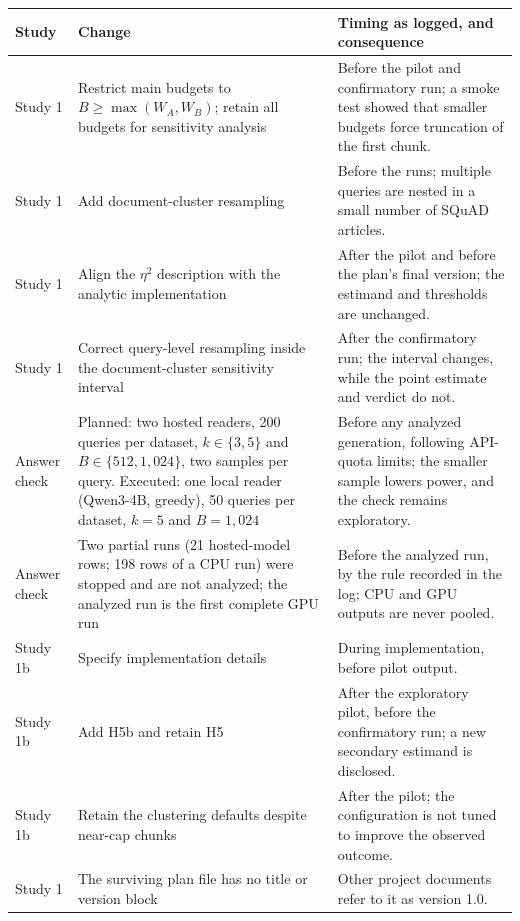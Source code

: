 \documentclass[11pt]{article}
\let\RepoTable\table
\let\EndRepoTable\endtable
\renewenvironment{table}[1][htbp]{\RepoTable[htbp]}{\EndRepoTable}
\begin{document}
\begin{table}[htbp]\centering\footnotesize
\caption{Study-plan deviations (as logged) and differences between the plans' text and the implementation.}\label{tab:deviations}
\begin{tabular}{@{}>{\raggedright\arraybackslash}p{1.55cm}>{\raggedright\arraybackslash}p{5.5cm}>{\raggedright\arraybackslash}p{7.4cm}@{}}\toprule
Study & Change & Timing as logged, and consequence\\\midrule
Study 1 & Restrict main budgets to $B\geq\max(W_A,W_B)$; retain all budgets for sensitivity analysis & Before the pilot and confirmatory run; a smoke test showed that smaller budgets force truncation of the first chunk.\\
Study 1 & Add document-cluster resampling & Before the runs; multiple queries are nested in a small number of SQuAD articles.\\
Study 1 & Align the $\eta^2$ description with the analytic implementation & After the pilot and before the plan's final version; the estimand and thresholds are unchanged.\\
Study 1 & Correct query-level resampling inside the document-cluster sensitivity interval & After the confirmatory run; the interval changes, while the point estimate and verdict do not.\\
Answer check & Planned: two hosted readers, 200 queries per dataset, $k\in\{3,5\}$ and $B\in\{512,1{,}024\}$, two samples per query. Executed: one local reader (Qwen3-4B, greedy), 50 queries per dataset, $k=5$ and $B=1{,}024$ & Before any analyzed generation, following API-quota limits; the smaller sample lowers power, and the check remains exploratory.\\
Answer check & Two partial runs (21 hosted-model rows; 198 rows of a CPU run) were stopped and are not analyzed; the analyzed run is the first complete GPU run & Before the analyzed run, by the rule recorded in the log; CPU and GPU outputs are never pooled.\\
Study 1b & Specify implementation details & During implementation, before pilot output.\\
Study 1b & Add H5b and retain H5 & After the exploratory pilot, before the confirmatory run; a new secondary estimand is disclosed.\\
Study 1b & Retain the clustering defaults despite near-cap chunks & After the pilot; the configuration is not tuned to improve the observed outcome.\\
Study 1 & The surviving plan file has no title or version block & Other project documents refer to it as version 1.0.\\

\end{tabular}
\end{table}
\end{document}
